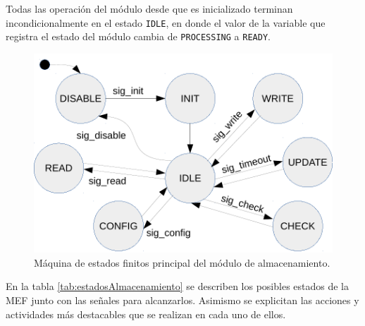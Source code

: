Todas las operación del módulo desde que es inicializado terminan incondicionalmente en el estado \texttt{IDLE}, en donde el valor de la variable que registra el estado del módulo cambia de \texttt{PROCESSING} a \texttt{READY}.

\begin{figure}[htpb]
	\centering
	\includegraphics[width=\textwidth]{./Figures/MEF_sdCard_2.pdf}
	\caption[MEF principal del módulo de almacenamiento sdCard]{Máquina de estados finitos principal del módulo de almacenamiento.}
	\label{fig:mef_sdcard}
\end{figure}


En la tabla \ref{tab:estadosAlmacenamiento} se describen los posibles estados de la MEF junto con las señales para alcanzarlos. Asimismo se explicitan las acciones y actividades más destacables que se realizan en cada uno de ellos.

